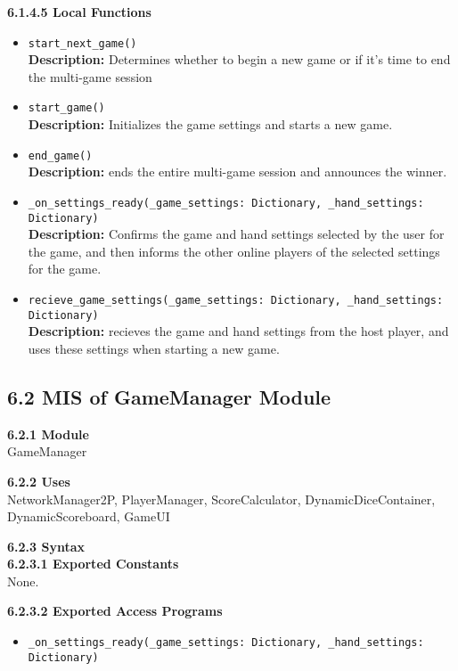 \documentclass[12pt, titlepage]{article}
\begin{document}
\textbf{6.1.4.5 Local Functions}
\begin{itemize}
    \item \texttt{start\_next\_game()}\\
	\textbf{Description:} Determines whether to begin a new game or if it's time to end the multi-game session 
    
    \item \texttt{start\_game()}\\
    \textbf{Description:} Initializes the game settings and starts a new game.
    
    \item \texttt{end\_game()}\\
    \textbf{Description:} ends the entire multi-game session and announces the winner.
    
    \item \texttt{\_on\_settings\_ready(\_game\_settings: Dictionary, \_hand\_settings: Dictionary)}\\
    \textbf{Description:} Confirms the game and hand settings selected by the user for the game, and then informs the other online players of the selected settings for the game.
    
    \item \texttt{recieve\_game\_settings(\_game\_settings: Dictionary, \_hand\_settings: Dictionary)}\\
    \textbf{Description:} recieves the game and hand settings from the host player, and uses these settings when starting a new game.
    
\end{itemize}

\subsection*{6.2 MIS of GameManager Module}
\textbf{6.2.1 Module}\\
GameManager

\textbf{6.2.2 Uses}\\
NetworkManager2P, PlayerManager, ScoreCalculator, DynamicDiceContainer, DynamicScoreboard, GameUI

\textbf{6.2.3 Syntax}\\
\textbf{6.2.3.1 Exported Constants}\\
None.  

\textbf{6.2.3.2 Exported Access Programs}
\begin{itemize}
    \item \texttt{\_on\_settings\_ready(\_game\_settings: Dictionary, \_hand\_settings: Dictionary)}
\end{itemize}
\end{document}
